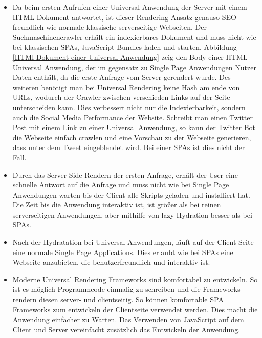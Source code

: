 \documentclass[runningheads]{llncs}
\numberwithin{figure}{section}
\begin{document}
\begin{itemize}
  \setlength\itemsep{1em}
  \item Da beim ersten Aufrufen einer Universal Anwendung der Server mit einem HTML Dokument antwortet, 
  ist dieser Rendering Ansatz genauso SEO freundlich wie normale klassische serverseitige Webseiten. 
  Der Suchmaschinencrawler erhält ein indexierbares Dokument und muss nicht wie bei klassischen SPAs, 
  JavaScript Bundles laden und starten. 
  Abbildung \ref{HTMl Dokument einer Universal Anwendung}
  zeig den Body einer HTML Universal Anwendung, der im gegensatz zu Single Page Anwendungen Nutzer Daten
  enthält, da die erste Anfrage vom Server gerendert wurde.
  Des weiteren benötigt man bei Universal Rendering keine Hash am ende von URLs, 
  wodurch der Crawler zwischen verschieden Links auf der Seite unterscheiden kann. 
  Dies verbessert nicht nur die Indexierbarkeit, 
  sondern auch die Social Media Performance der Website. 
  Schreibt man einen Twitter Post mit einem Link zu einer Universal Anwendung, 
  so kann der Twitter Bot die Webseite einfach crawlen und eine Vorschau zu der Webseite generieren, 
  dass unter dem Tweet eingeblendet wird. 
  Bei einer SPAs ist dies nicht der Fall.
  \newpage
  \item Durch das Server Side Rendern der ersten Anfrage, 
  erhält der User eine schnelle Antwort auf die Anfrage und 
  muss nicht wie bei Single Page Anwendungen warten bis der Client alle Skripts geladen und 
  installiert hat. Die Zeit bis die Anwendung interaktiv ist, 
  ist größer als bei reinen serverseitigen Anwendungen, 
  aber mithilfe von lazy Hydration besser als bei SPAs. 
  \item Nach der Hydratation bei Universal Anwendungen, 
  läuft auf der Client Seite eine normale Single Page Applications. 
  Dies erlaubt wie bei SPAs eine Webseite anzubieten, 
  die benutzerfreundlich und interaktiv ist.
  \item Moderne Universal Rendering Frameworks sind komfortabel zu entwickeln. 
  So ist es möglich Programmcode einmalig zu schreiben und 
  die Frameworks rendern diesen server- und clientseitig. 
  So können komfortable SPA Frameworks zum entwickeln der Clientseite verwendet werden. 
  Dies macht die Anwendung einfacher zu Warten. 
  Das Verwenden von JavaScript auf dem Client und 
  Server vereinfacht zusätzlich das Entwickeln der Anwendung.
\end{itemize}
\end{document}
